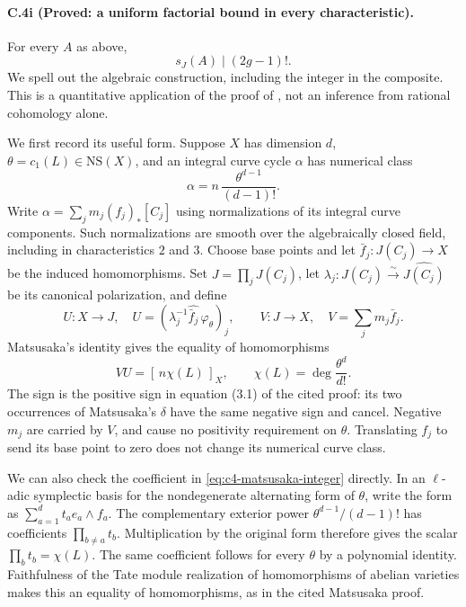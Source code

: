 \paragraph{C.4i (Proved: a uniform factorial bound in every characteristic).}
For every $A$ as above,
\begin{equation}\label{eq:c4-factorial-bound}
             s_J(A)\mid(2g-1)!.
\end{equation}
We spell out the algebraic construction, including the integer in the
composite. This is a quantitative application of the proof of
\citet[Proposition 3.4, equations (3.1)--(3.3)]{cyScaviaSuzuki2025},
not an inference from rational cohomology alone.

We first record its useful form. Suppose $X$ has dimension $d$,
$\theta=c_1(L)\in\mathrm{NS}(X)$, and an integral curve cycle
$\alpha$ has numerical class
\[
                  \alpha=n\,\frac{\theta^{d-1}}{(d-1)!}.
\]
Write $\alpha=\sum_j m_j(f_j)_*[C_j]$ using normalizations of its
integral curve components. Such normalizations are smooth over the
algebraically closed field, including in characteristics $2$ and $3$.
Choose base points and let $\bar f_j:J(C_j)\to X$ be the induced
homomorphisms. Set $J=\prod_jJ(C_j)$, let
$\lambda_j:J(C_j)\xrightarrow{\sim}\widehat{J(C_j)}$ be its canonical
polarization, and define
\[
 U:X\longrightarrow J,\quad
 U=(\lambda_j^{-1}\widehat{\bar f_j}\,\varphi_\theta)_j,
 \qquad
 V:J\longrightarrow X,\quad V=\sum_jm_j\bar f_j.
\]
Matsusaka's identity gives the equality of homomorphisms
\begin{equation}\label{eq:c4-matsusaka-integer}
               VU=[\,n\chi(L)\,]_X,\qquad
               \chi(L)=\deg\frac{\theta^d}{d!}.
\end{equation}
The sign is the positive sign in equation (3.1) of the cited proof:
its two occurrences of Matsusaka's $\delta$ have the same negative
sign and cancel. Negative $m_j$ are carried by $V$, and cause no
positivity requirement on $\theta$. Translating $f_j$ to send its
base point to zero does not change its numerical curve class.

We can also check the coefficient in \eqref{eq:c4-matsusaka-integer}
directly. In an $\ell$-adic symplectic basis for the nondegenerate
alternating form of $\theta$, write the form as
$\sum_{a=1}^{d}t_a e_a\wedge f_a$.
The complementary exterior power
$\theta^{d-1}/(d-1)!$ has coefficients
$\prod_{b\ne a}t_b$. Multiplication by the original form therefore
gives the scalar $\prod_b t_b=\chi(L)$.
The same coefficient follows for every $\theta$ by a polynomial
identity. Faithfulness of the Tate module realization of
homomorphisms of abelian varieties makes this an equality of
homomorphisms, as in the cited Matsusaka proof.

